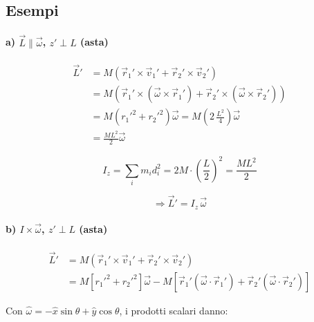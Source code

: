 
\subsection{Esempi}


\paragraph{a) $\vec{L} \parallel \vec{\omega}$, $z' \perp L$ (asta)}

\begin{align*}
\vec{L}' &= M(\vec{r}_1' \times \vec{v}_1' + \vec{r}_2' \times \vec{v}_2') \\
&= M\left(\vec{r}_1' \times (\vec{\omega} \times \vec{r}_1') + \vec{r}_2' \times (\vec{\omega} \times \vec{r}_2')\right) \\
&= M\left(r_1'^2 + r_2'^2\right)\vec{\omega} = M\left(2\,\frac{L^2}{4}\right)\vec{\omega} \\
&= \frac{ML^2}{2}\vec{\omega}
\end{align*}

\begin{equation}
I_z = \sum_i m_i d_i^2 = 2M \cdot \left(\frac{L}{2}\right)^2 = \frac{ML^2}{2}
\end{equation}

\begin{equation}
\Rightarrow \boxed{\vec{L}' = I_z\,\vec{\omega}}
\end{equation}

\paragraph{b) $I \times \vec{\omega}$, $z' \perp L$ (asta)}

\begin{align*}
\vec{L}' &= M(\vec{r}_1' \times \vec{v}_1' + \vec{r}_2' \times \vec{v}_2') \\
&= M\left[r_1'^2 + r_2'^2\right]\vec{\omega} - M\left[\vec{r}_1'(\vec{\omega} \cdot \vec{r}_1') + \vec{r}_2'(\vec{\omega} \cdot \vec{r}_2')\right]
\end{align*}

Con $\hat{\omega} = -\hat{x}\sin\theta + \hat{y}\cos\theta$, i prodotti scalari danno:

